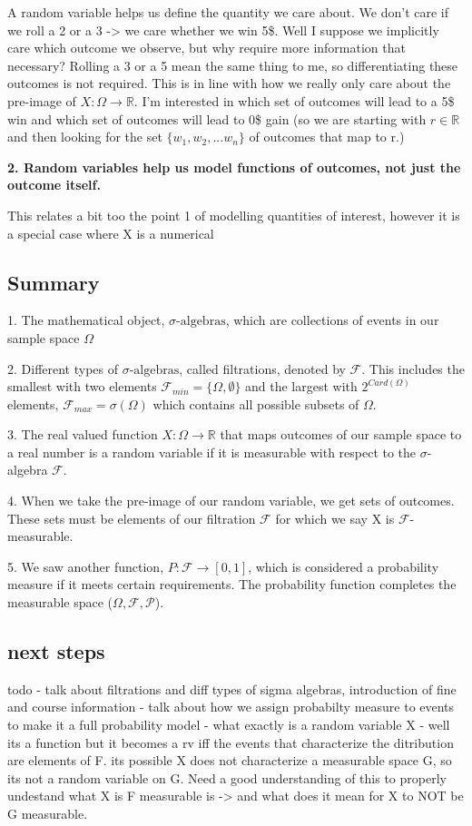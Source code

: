 \documentclass[11pt]{article}
\newcommand{\sigalg}{\sigma\text{-algebras}}
\newcommand{\filt}{\mathcal{F}}
\newcommand{\rv}{X:\Omega \rightarrow \mathbb{R}}
\begin{document}
A random variable helps us define the quantity we care about. We don't care if we roll a 2 or a 3 -> we care whether we win 5\$. Well I suppose we implicitly care which outcome we observe, but why require more information that necessary? Rolling a 3 or a 5 mean the same thing to me, so differentiating these outcomes is not required. This is in line with how we really only care about the pre-image of $\rv$. I'm interested in which set of outcomes will lead to a 5\$ win and which set of outcomes will lead to 0\$ gain (so we are starting with $r \in \mathbb{R}$ and then looking for the set $\{w_1,w_2,...w_n\}$ of outcomes that map to r.)


\textbf{2. Random variables help us model functions of outcomes, not just the outcome itself.}

This relates a bit too the point 1 of modelling quantities of interest, however it is a special case where X is a numerical 


\subsection{Summary}

1. The mathematical object, $\sigalg$, which are collections of events in our sample space $\Omega$

2. Different types of $\sigalg$, called filtrations, denoted by $\filt$. This includes the smallest with two elements $\filt_{min}= \{\Omega,\emptyset\}$ and the largest with $2^{Card(\Omega)}$ elements, $\filt_{max}=\sigma(\Omega)$ which contains all possible subsets of $\Omega$.

3. The real valued function $\rv$ that maps outcomes of our sample space to a real number is a random variable if it is measurable with respect to the $\sigma$-algebra $\filt$.

4. When we take the pre-image of our random variable, we get sets of outcomes. These sets must be elements of our filtration $\filt$ for which we say X is $\filt$-measurable.

5. We saw another function, $P: \mathcal{F} \to [0, 1]$, which is considered a probability measure if it meets certain requirements. The probability function completes the measurable space ($\Omega, \filt, \mathcal{P}$).



\newpage


\subsection{next steps}
todo 
- talk about filtrations and diff types of sigma algebras, introduction of fine and course information
- talk about how we assign probabilty measure to events to make it a full probability model
- what exactly is a random variable X - well its a function but it becomes a rv iff the events that characterize the ditribution are elements of F. its possible X does not characterize a measurable space G, so its not a random variable on G. Need a good understanding of this to properly undestand what X is F measurable is -> and what does it mean for X to NOT be G measurable.
\end{document}
